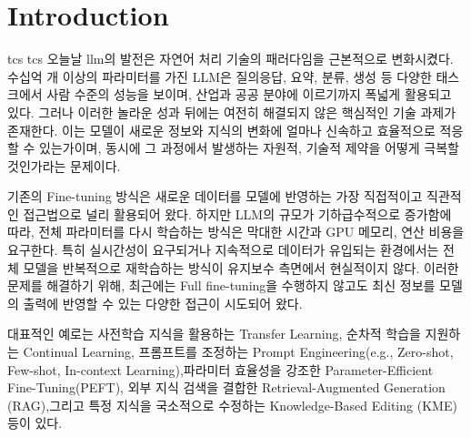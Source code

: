 \documentclass[a4paper,fleqn]{cas-sc}
\begin{document}
\maketitle

\section{Introduction}
\gls{tcs}
\gls{tcs}
오늘날 \gls{llm}의 발전은 자연어 처리 기술의 패러다임을 근본적으로 변화시켰다. 
수십억 개 이상의 파라미터를 가진 LLM은 질의응답, 요약, 분류, 생성 등 다양한 태스크에서 사람 수준의 성능을 보이며, 산업과 공공 분야에 이르기까지 폭넓게 활용되고 있다. 
그러나 이러한 놀라운 성과 뒤에는 여전히 해결되지 않은 핵심적인 기술 과제가 존재한다. 
이는 모델이 새로운 정보와 지식의 변화에 얼마나 신속하고 효율적으로 적응할 수 있는가이며, 동시에 그 과정에서 발생하는 자원적, 기술적 제약을 어떻게 극복할 것인가라는 문제이다.

기존의 Fine-tuning 방식은 새로운 데이터를 모델에 반영하는 가장 직접적이고 직관적인 접근법으로 널리 활용되어 왔다. 
하지만 LLM의 규모가 기하급수적으로 증가함에 따라, 전체 파라미터를 다시 학습하는 방식은 막대한 시간과 GPU 메모리, 연산 비용을 요구한다. 
특히 실시간성이 요구되거나 지속적으로 데이터가 유입되는 환경에서는 전체 모델을 반복적으로 재학습하는 방식이 유지보수 측면에서 현실적이지 않다. 
이러한 문제를 해결하기 위해, 최근에는 Full fine-tuning을 수행하지 않고도 최신 정보를 모델의 출력에 반영할 수 있는 다양한 접근이 시도되어 왔다. 

대표적인 예로는 사전학습 지식을 활용하는 Transfer Learning, 순차적 학습을 지원하는 Continual Learning, 프롬프트를 조정하는 Prompt Engineering(e.g., Zero-shot, Few-shot, In-context Learning),파라미터 효율성을 강조한 Parameter-Efficient Fine-Tuning(PEFT), 외부 지식 검색을 결합한 Retrieval-Augmented Generation (RAG),그리고 특정 지식을 국소적으로 수정하는 Knowledge-Based Editing (KME) 등이 있다.
\end{document}
